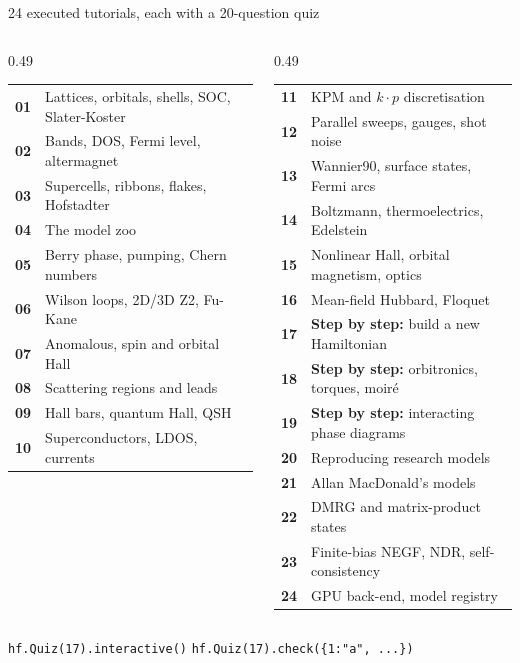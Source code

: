 \documentclass[aspectratio=169,11pt]{beamer}
\begin{document}
\begin{frame}{24 executed tutorials, each with a 20-question quiz}
\scriptsize
\renewcommand{\arraystretch}{1.12}
\begin{columns}[T]
\begin{column}{0.49\textwidth}
\begin{tabular}{@{}>{\color{accent}\bfseries}r l@{}}
01 & Lattices, orbitals, shells, SOC, Slater-Koster\\
02 & Bands, DOS, Fermi level, altermagnet\\
03 & Supercells, ribbons, flakes, Hofstadter\\
04 & The model zoo\\
05 & Berry phase, pumping, Chern numbers\\
06 & Wilson loops, 2D/3D Z2, Fu-Kane\\
07 & Anomalous, spin and orbital Hall\\
08 & Scattering regions and leads\\
09 & Hall bars, quantum Hall, QSH\\
10 & Superconductors, LDOS, currents\\
\end{tabular}
\end{column}
\begin{column}{0.49\textwidth}
\begin{tabular}{@{}>{\color{accent}\bfseries}r l@{}}
11 & KPM and $k\!\cdot\!p$ discretisation\\
12 & Parallel sweeps, gauges, shot noise\\
13 & Wannier90, surface states, Fermi arcs\\
14 & Boltzmann, thermoelectrics, Edelstein\\
15 & Nonlinear Hall, orbital magnetism, optics\\
16 & Mean-field Hubbard, Floquet\\
17 & \textbf{Step by step:} build a new Hamiltonian\\
18 & \textbf{Step by step:} orbitronics, torques, moiré\\
19 & \textbf{Step by step:} interacting phase diagrams\\
20 & Reproducing research models\\
21 & Allan MacDonald's models\\
22 & DMRG and matrix-product states\\
23 & Finite-bias NEGF, NDR, self-consistency\\
24 & GPU back-end, model registry\\
\end{tabular}
\end{column}
\end{columns}
\vspace{8pt}
\normalsize\centering \texttt{hf.Quiz(17).interactive()} \quad\textbullet\quad \texttt{hf.Quiz(17).check(\{1:"a", ...\})}
\end{frame}
\end{document}
